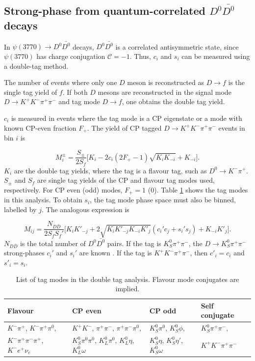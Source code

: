 \documentclass[12pt, a4paper, notitlepage, onecolumn]{article}
\begin{document}
\subsection{Strong-phase from quantum-correlated \texorpdfstring{$D^0\bar{D^0}$}{DD} decays}
In $\psi(3770)\to D^0\bar{D^0}$ decays, $D^0\bar{D^0}$ is a correlated antisymmetric state, since $\psi(3770)$ has charge conjugation $\mathcal{C} = -1$. Thus, $c_i$ and $s_i$ can be measured using a double-tag method.

The number of events where only one $D$ meson is reconstructed as $D\to f$ is the single tag yield of $f$. If both $D$ mesons are reconstructed in the signal mode $D\to K^+K^-\pi^+\pi^-$ and tag mode $D\to f$, one obtains the double tag yield.

$c_i$ is measured in events where the tag mode is a CP eigenstate or a mode with known CP-even fraction $F_+$. The yield of CP tagged $D\to K^+K^-\pi^+\pi^-$ events in bin $i$ is

\begin{equation}
  M_i^\pm = \frac{S_\pm}{2S_f}\Big[K_i - 2c_i(2F_+ - 1)\sqrt{K_iK_{-i}} + K_{-i}\Big].
  \label{eq_Mi}
\end{equation}
$K_i$ are the double tag yields, where the tag is a flavour tag, such as $D^0\to K^-\pi^+$. $S_\pm$ and $S_f$ are single tag yields of the CP and flavour tag modes used, respectively. For CP even (odd) modes, $F_+ = 1$ ($0$). Table \ref{table_tag_modes} shows the tag modes in this analysis. To obtain $s_i$, the tag mode phase space must also be binned, labelled by $j$. The analogous expression is

\begin{equation}
  M_{ij} = \frac{N_{D\bar{D}}}{2S_fS_f'}\Big[K_iK'_{-j} + 2\sqrt{K_iK'_{-j}K_{-i}K'_j}(c_i'c_j + s_i's_j) + K_{-i}K'_j\Big].
  \label{eq_Mij}
\end{equation}
$N_{D\bar{D}}$ is the total number of $D^0\bar{D^0}$ pairs. If the tag is $K_S^0\pi^+\pi^-$, the $D\to K_S^0\pi^+\pi^-$ strong-phases $c_i'$ and $s_i'$ are known \cite{cite_KSKKAnalysis}. If the tag is $K^+K^-\pi^+\pi^-$, then $c'_i = c_i$ and $s'_i = s_i$.

\begin{table}[H]
  \centering
  \caption{List of tag modes in the double tag analysis. Flavour mode conjugates are implied.}
  \label{table_tag_modes}
  \begin{tabular}{llll} 
    \toprule
    Flavour & CP even & CP odd & Self conjugate \\
    \midrule
    $K^-\pi^+$, $K^-\pi^+\pi^0$,         & $K^+K^-$, $\pi^+\pi^-$, $\pi^+\pi^-\pi^0$,                  & $K_S^0\pi^0$, $K_S^0\phi$,               & $K_S^0\pi^+\pi^-$, \\
    $K^-\pi^+\pi^-\pi^+$, $K^- e^+\nu_e$ & $K_S^0\pi^0\pi^0$, $K_L^0\pi^0$, $K_L^0\eta$, $K_L^0\omega$ & $K_S^0\eta$, $K_S^0\eta'$, $K_S^0\omega$ & $K^+K^-\pi^+\pi^-$ \\
    \bottomrule
  \end{tabular}
\end{table}
\end{document}

